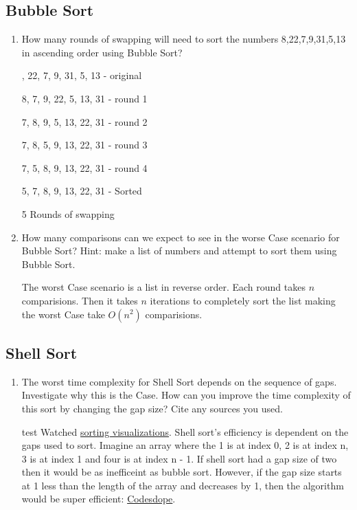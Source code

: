 \documentclass[12pt]{article}
\newenvironment{QandA}{\begin{enumerate}[label=\bfseries\alph*.]\bfseries}
{\end{enumerate}}
\newenvironment{answered}{\par\normalfont}{}
\begin{document}
    \subsection{Bubble Sort}
    \begin{QandA}

    \item How many rounds of swapping will need to sort the numbers 8,22,7,9,31,5,13 in ascending order using Bubble Sort?
        \begin{answered}
            8, 22, 7, 9, 31, 5, 13 - original

            8, 7, 9, 22, 5, 13, 31 - round 1

            7, 8, 9, 5, 13, 22, 31 - round 2

            7, 8, 5, 9, 13, 22, 31 - round 3

            7, 5, 8, 9, 13, 22, 31 - round 4

            5, 7, 8, 9, 13, 22, 31 - Sorted

            5 Rounds of swapping
        \end{answered}

    \item How many comparisons can we expect to see in the worse Case scenario for Bubble Sort? Hint: make a list of numbers and attempt to sort them using Bubble Sort.

        \begin{answered}
			The worst Case scenario is a list in reverse order. Each round takes $n$ comparisions. Then it takes $n$ iterations to completely sort the list making the worst Case take $O(n^2)$ comparisions.
        \end{answered}
    \end{QandA}

    \subsection{Shell Sort}
    \begin{QandA}

    \item The worst time complexity for Shell Sort depends on the sequence of gaps. Investigate why this is the Case. How can you improve the time complexity of this sort by changing the gap size? Cite any sources you used.
        \begin{answered}
            test Watched \href{https://www.youtube.com/watch?v=NYWEM7H3iYc\&t=269s}{sorting visualizations}.
			Shell sort's efficiency is dependent on the gaps used to sort. Imagine an array where the 1 is at index 0, 2 is at index n, 3 is at index 1 and four is at index n - 1. If shell sort had a gap size of two then it would be as inefficeint as bubble sort.
			However, if the gap size starts at 1 less than the length of the array and decreases by 1, then the algorithm would be super efficient: \href{https://www.codesdope.com/blog/article/shell-sort/}{Codesdope}.
        \end{answered}

    \end{QandA}
\end{document}
